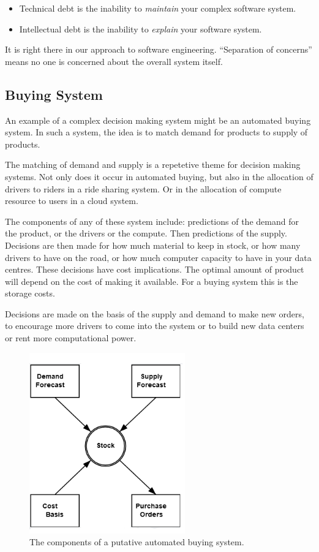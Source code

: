 \documentclass[a4paper]{caesar_book}
\begin{document}
\begin{itemize}
    \item Technical debt is the inability to \textit{maintain} your complex software system.
    \item Intellectual debt is the inability to \textit{explain} your software system.
\end{itemize}

It is right there in our approach to software engineering. ``Separation of concerns'' means no one is concerned about the overall system itself.

\subsection{Buying System}

An example of a complex decision making system might be an automated buying system. In such a system, the idea is to match demand for products to supply of products.

The matching of demand and supply is a repetetive theme for decision making systems. Not only does it occur in automated buying, but also in the allocation of drivers to riders in a ride sharing system. Or in the allocation of compute resource to users in a cloud system.

The components of any of these system include: predictions of the demand for the product, or the drivers or the compute. Then predictions of the supply. Decisions are then made for how much material to keep in stock, or how many drivers to have on the road, or how much computer capacity to have in your data centres. These decisions have cost implications. The optimal amount of product will depend on the cost of making it available. For a buying system this is the storage costs.

Decisions are made on the basis of the supply and demand to make new orders, to encourage more drivers to come into the system or to build new data centers or rent more computational power.

\begin{figure}[htbp]%
	\includegraphics[width=0.6\textwidth,keepaspectratio]{pictures/buying_1.PNG}%
	\caption*{The components of a putative automated buying system.}%
\end{figure}%
\end{document}
